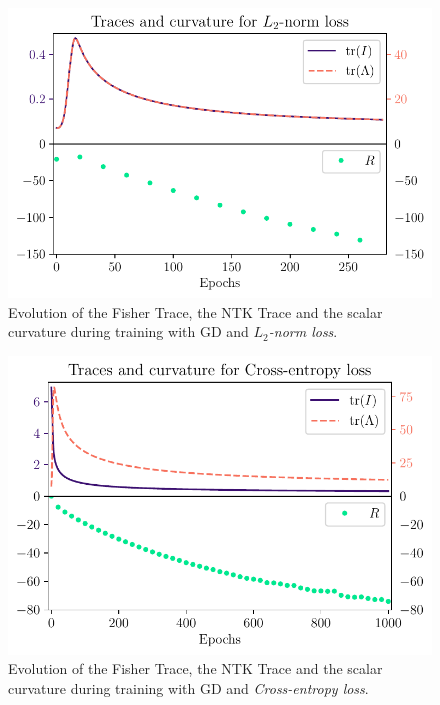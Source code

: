 \begin{figure}
	\centering
	\includegraphics{Experiment2/plots/LPNormLoss2_Curves.pdf}
	\caption{Evolution of the Fisher Trace, the NTK Trace and the scalar curvature during training with GD and \emph{$L_2$-norm loss}.}
	\label{fig:Results2LPNormLossCurves}
\end{figure}

\begin{figure}
	\centering
	\includegraphics{Experiment2/plots/CrossEntropyLoss_Curves.pdf}
	\caption{Evolution of the Fisher Trace, the NTK Trace and the scalar curvature during training with GD and \emph{Cross-entropy loss}.}
	\label{fig:Results2CrossEntropyLossCurves}
\end{figure}

